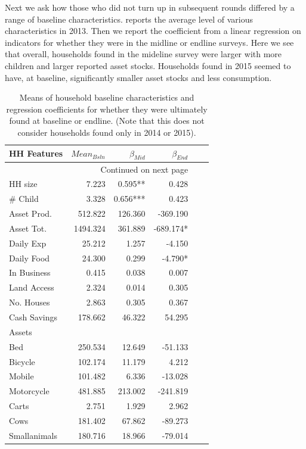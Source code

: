 \documentclass[12pt,article]{article}
\begin{document}
Next we ask how those who did not turn up in subsequent rounds differed by a range of
baseline characteristics.  reports the average level of
various characteristics in 2013. Then we report the coefficient from a linear
regression on indicators for whether they were in the midline or endline surveys.
Here we see that overall, households found in the mideline survey were larger with
more children and larger reported asset stocks. Households found in 2015 seemed to
have, at baseline, significantly smaller asset stocks and less consumption.

\begin{longtable}{lrrrrr}
\caption{\label{tab:attrition_balance}Means of household baseline characteristics and regression coefficients for whether they were ultimately found at baseline or endline. (Note that this does not consider households found only in 2014 or 2015).}
\\
\hline
HH Features & $Mean_{Bsln}$ & $\beta_{Mid}$ & $\beta_{End}$\\
\hline
\endhead
\hline\multicolumn{4}{r}{Continued on next page} \\
\endfoot
\endlastfoot
HH size & 7.223 & 0.595** & 0.428\\
\# Child & 3.328 & 0.656*** & 0.423\\
Asset Prod. & 512.822 & 126.360 & -369.190\\
Asset Tot. & 1494.324 & 361.889 & -689.174*\\
Daily Exp & 25.212 & 1.257 & -4.150\\
Daily Food & 24.300 & 0.299 & -4.790*\\
In Business & 0.415 & 0.038 & 0.007\\
Land Access & 2.324 & 0.014 & 0.305\\
No. Houses & 2.863 & 0.305 & 0.367\\
Cash Savings & 178.662 & 46.322 & 54.295\\
\hline
Assets &  &  & \\
\hline
Bed & 250.534 & 12.649 & -51.133\\
Bicycle & 102.174 & 11.179 & 4.212\\
Mobile & 101.482 & 6.336 & -13.028\\
Motorcycle & 481.885 & 213.002 & -241.819\\
Carts & 2.751 & 1.929 & 2.962\\
Cows & 181.402 & 67.862 & -89.273\\
Smallanimals & 180.716 & 18.966 & -79.014\\

\end{longtable}
\end{document}
